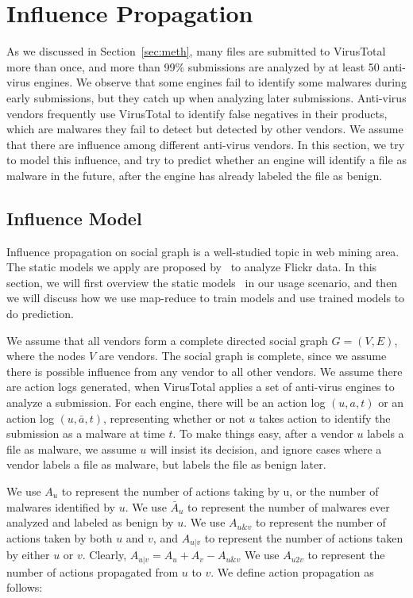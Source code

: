 \section{Influence Propagation}
\label{sec:influ}

As we discussed in Section~\ref{sec:meth}, 
many files are submitted to VirusTotal more than once, 
and more than 99\% submissions are analyzed by at least 50 anti-virus engines. 
We observe that some engines fail to identify some malwares during early submissions, 
but they catch up when analyzing later submissions. 
Anti-virus vendors frequently use VirusTotal to identify false negatives in their products, 
which are malwares they fail to detect but detected by other vendors. 
We assume that there are influence among different anti-virus vendors.
In this section, we try to model this influence,
and try to predict whether an engine will identify a file as malware in the future, 
after the engine has already labeled the file as benign.

\subsection{Influence Model}
\label{sec:model}

Influence propagation on social graph is a well-studied topic in web mining area. 
The static models we apply are proposed by~\citet{Influence} to analyze Flickr data.
In this section, we will first overview the static models~\cite{Influence} in our usage scenario, 
and then we will discuss how we use map-reduce to train models and use trained models to do prediction.  

We assume that all vendors form a complete directed social graph $G = (V, E)$, 
where the nodes $V$ are vendors. 
The social graph is complete, 
since we assume there is possible influence from any vendor to all other vendors.
We assume there are action logs generated, 
when VirusTotal applies a set of anti-virus engines to analyze a submission. 
For each engine, there will be an action log $(u, a, t)$ or an action log $(u, \bar{a}, t)$, 
representing whether or not $u$ takes action to identify the submission as a malware at time $t$. 
To make things easy, after a vendor $u$ labels a file as malware, 
we assume $u$ will insist its decision, 
and ignore cases where a vendor labels a file as malware, but labels the file as benign later. 

We use $A_u$ to represent the number of actions taking by u, 
or the number of malwares identified by $u$. 
We use $\bar{A}_u$ to represent the number of malwares ever analyzed and labeled as benign by $u$.
We use $A_{u\&v}$ to represent the number of actions taken by both $u$ and $v$, 
and $A_{u|v}$ to represent the number of actions taken by either $u$ or $v$.
Clearly, $A_{u|v} =   A_u + A_v - A_{u\&v}$
We use $A_{u2v}$ to represent the number of actions propagated from $u$ to $v$. 
We define action propagation as follows: 

